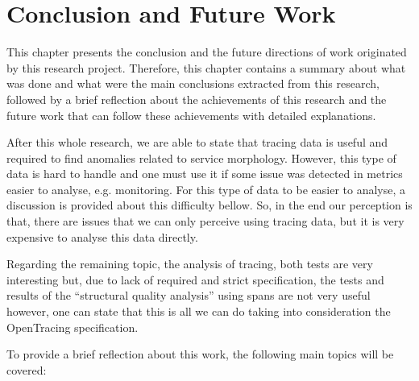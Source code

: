 \glsresetall
\chapter{Conclusion and Future Work}
\label{chap:conclusion_and_future_work}

This chapter presents the conclusion and the future directions of work originated by this research project. Therefore, this chapter contains a summary about what was done and what were the main conclusions extracted from this research, followed by a brief reflection about the achievements of this research and the future work that can follow these achievements with detailed explanations.



After this whole research, we are able to state that tracing data is useful and required to find anomalies related to service morphology. However, this type of data is hard to handle and one must use it if some issue was detected in metrics easier to analyse, e.g. monitoring. For this type of data to be easier to analyse, a discussion is provided about this difficulty bellow. So, in the end our perception is that, there are issues that we can only perceive using tracing data, but it is very expensive to analyse this data directly.

Regarding the remaining topic, the analysis of tracing, both tests are very interesting but, due to lack of required and strict specification, the tests and results of the ``structural quality analysis'' using spans are not very useful however, one can state that this is all we can do taking into consideration the OpenTracing specification.


To provide a brief reflection about this work, the following main topics will be covered:

